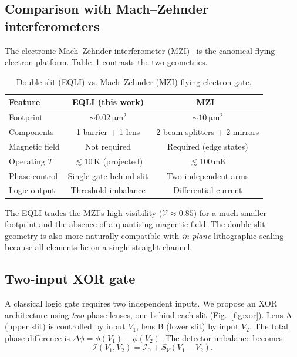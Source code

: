 \documentclass[11pt,a4paper]{article}
\begin{document}
\subsection{Comparison with Mach--Zehnder interferometers}
\label{sec:mzi}

The electronic Mach--Zehnder interferometer (MZI)~\cite{ji2003} is the 
canonical flying-electron platform. Table~\ref{tab:comparison} contrasts the 
two geometries.

\begin{table}[t]
\centering
\caption{Double-slit (EQLI) vs. Mach--Zehnder (MZI) flying-electron gate.}
\label{tab:comparison}
\begin{tabular}{@{}lcc@{}}
\toprule
Feature & EQLI (this work) & MZI~\cite{ji2003} \\
\midrule
Footprint & $\sim\SI{0.02}{\micro\meter\squared}$ & $\sim\SI{10}{\micro\meter\squared}$ \\
Components & 1 barrier + 1 lens & 2 beam splitters + 2 mirrors \\
Magnetic field & Not required & Required (edge states) \\
Operating $T$ & $\lesssim 10\,$K (projected) & $\lesssim 100\,$mK \\
Phase control & Single gate behind slit & Two independent arms \\
Logic output & Threshold imbalance & Differential current \\
\bottomrule
\end{tabular}
\end{table}

The EQLI trades the MZI's high visibility ($\mathcal{V}\approx 0.85$) for a 
much smaller footprint and the absence of a quantising magnetic field. The 
double-slit geometry is also more naturally compatible with \emph{in-plane} 
lithographic scaling because all elements lie on a single straight channel.

\subsection{Two-input XOR gate}
\label{sec:xor}

A classical logic gate requires two independent inputs. We propose an XOR 
architecture using \emph{two} phase lenses, one behind each slit 
(Fig.~\ref{fig:xor}). Lens A (upper slit) is controlled by input $V_1$, lens 
B (lower slit) by input $V_2$. The total phase difference is 
$\Delta\phi = \phi(V_1) - \phi(V_2)$. The detector imbalance becomes
\begin{equation}
\mathcal{I}(V_1,V_2) = \mathcal{I}_0 + S_V(V_1 - V_2).
\label{eq:xor}
\end{equation}
\end{document}
